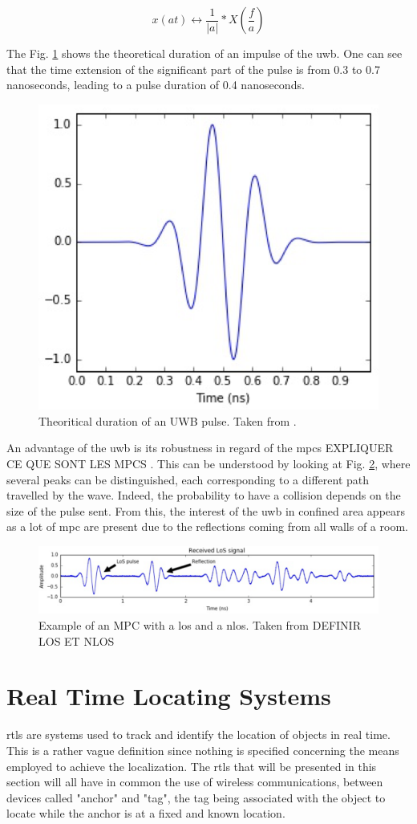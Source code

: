 \begin{equation}
	x(at) \longleftrightarrow \frac{1}{|a|}*X(\frac{f}{a})
\label{fig:eq}
\end{equation}

The Fig. \ref{fig:UWB_time} shows the theoretical duration of an impulse of the \gls{uwb}. One can see that the time extension of the significant part of the pulse is from 0.3 to 0.7 nanoseconds, leading to a pulse duration of 0.4 nanoseconds.

\begin{figure}[H]
\centering
\includegraphics[width=.4\linewidth]{Images/uwb_pulse.png}
\caption{Theoritical duration of an UWB pulse. Taken from \cite{defraye2017determining}.}
\label{fig:UWB_time}
\end{figure}

An advantage of the \gls{uwb} is its robustness in regard of the \glspl{mpc} \color{red} EXPLIQUER CE QUE SONT LES MPCS \color{black}.  This can be understood by looking at Fig. \ref{fig:UWB_MPC_Theo}, where several peaks can be distinguished, each corresponding to a different path travelled by the wave. Indeed, the probability to have a collision depends on the size of the pulse sent. From this, the interest of the \gls{uwb} in confined area appears as a lot of \gls{mpc} are present due to the reflections coming from all walls of a room.

\begin{figure}[H]
\centering
\includegraphics[width=.9\linewidth]{Images/mpc_pulses.png}
\caption{Example of an MPC with a \gls{los} and a \gls{nlos}. Taken from \cite{defraye2017determining}\color{red} DEFINIR LOS ET NLOS \color{black}}
\label{fig:UWB_MPC_Theo}
\end{figure}

\section{Real Time Locating Systems}
\label{rtls}
\gls{rtls} are systems used to track and identify the location of objects in real time. This is a rather vague definition since nothing is specified concerning the means employed to achieve the localization. The \gls{rtls} that will be presented in this section will all have in common the use of wireless communications, between devices called "anchor" and "tag", the tag being associated with the object to locate while the anchor is at a fixed and known location.
\vspace{2mm}

